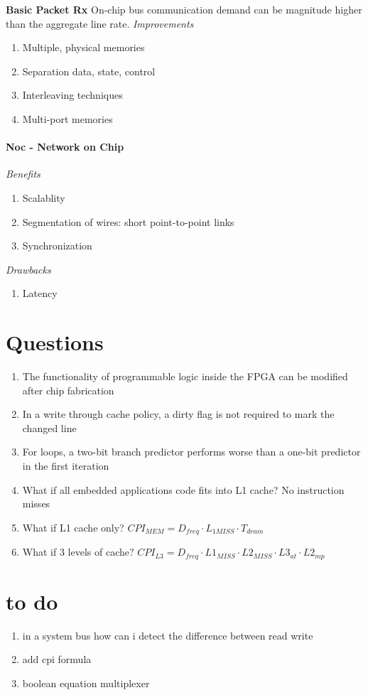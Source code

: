 \documentclass[english]{latex4ei/latex4ei_sheet}
\begin{document}
\textbf{Basic Packet Rx} On-chip bus communication demand can be magnitude higher than the aggregate line rate.
\textit{Improvements}
\begin{enumerate}
	\item Multiple, physical memories
	\item Separation data, state, control
	\item Interleaving techniques
	\item Multi-port memories
\end{enumerate}

\paragraph{Noc - Network on Chip}
\textit{Benefits}
\begin{enumerate}
	\item Scalablity
	\item Segmentation of wires: short point-to-point links
	\item Synchronization
\end{enumerate}
\textit{Drawbacks}
\begin{enumerate}
	\item Latency
\end{enumerate}

\section{Questions}

\begin{enumerate}
	\item The functionality of programmable logic inside the FPGA can be modified after chip fabrication
	\item In a write through cache policy, a dirty flag is not required to mark the changed line
	\item For loops, a two-bit branch predictor performs worse than a one-bit predictor in the first iteration
	\item What if all embedded applications code fits into L1 cache? No instruction misses 
	\item What if L1 cache only? $CPI_{MEM} = D_{freq} \cdot L_{1MISS} \cdot T_{dram}$
	\item What if 3 levels of cache? $CPI_{L3} = D_{freq} \cdot L1_{MISS} \cdot L2_{MISS} \cdot L3_{at} \cdot L2_{mp}$

\end{enumerate}

\section{to do}
\begin{enumerate}
	\item in a system bus how can i detect the difference between read write
	\item add cpi formula
	\item boolean equation multiplexer
\end{enumerate}
\end{document}
